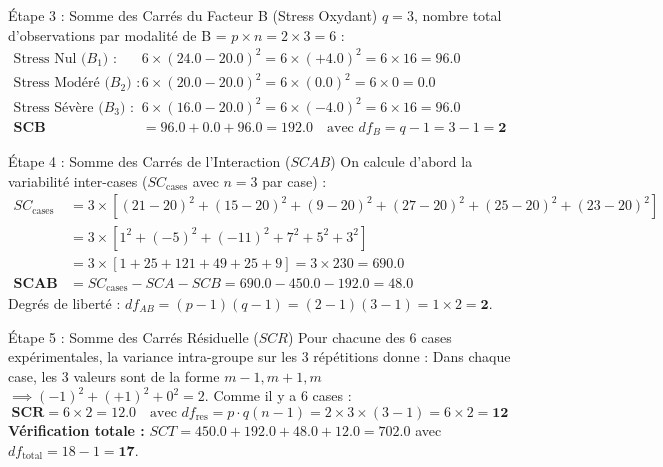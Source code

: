 \documentclass[11pt,a4paper]{article}
\begin{document}
\begin{stepbox}{Étape 3 : Somme des Carrés du Facteur B (Stress Oxydant)}
$q = 3$, nombre total d'observations par modalité de B = $p \times n = 2 \times 3 = 6$ :
\begin{align*}
\text{Stress Nul ($B_1$) :} \quad & 6 \times (24.0 - 20.0)^2 = 6 \times (+4.0)^2 = 6 \times 16 = 96.0 \\
\text{Stress Modéré ($B_2$) :} \quad & 6 \times (20.0 - 20.0)^2 = 6 \times (0.0)^2 = 6 \times 0 = 0.0 \\
\text{Stress Sévère ($B_3$) :} \quad & 6 \times (16.0 - 20.0)^2 = 6 \times (-4.0)^2 = 6 \times 16 = 96.0 \\[2mm]
\mathbf{SCB} &= 96.0 + 0.0 + 96.0 = \mathbf{192.0} \quad \text{avec } df_B = q - 1 = 3 - 1 = \mathbf{2}
\end{align*}
\end{stepbox}

\begin{stepbox}{Étape 4 : Somme des Carrés de l'Interaction ($SCAB$)}
On calcule d'abord la variabilité inter-cases ($SC_{\text{cases}}$ avec $n = 3$ par case) :
\begin{align*}
SC_{\text{cases}} &= 3 \times \left[ (21-20)^2 + (15-20)^2 + (9-20)^2 + (27-20)^2 + (25-20)^2 + (23-20)^2 \right] \\
&= 3 \times \left[ 1^2 + (-5)^2 + (-11)^2 + 7^2 + 5^2 + 3^2 \right] \\
&= 3 \times \left[ 1 + 25 + 121 + 49 + 25 + 9 \right] = 3 \times 230 = \mathbf{690.0} \\[2mm]
\mathbf{SCAB} &= SC_{\text{cases}} - SCA - SCB = 690.0 - 450.0 - 192.0 = \mathbf{48.0}
\end{align*}
Degrés de liberté : $df_{AB} = (p - 1)(q - 1) = (2 - 1)(3 - 1) = 1 \times 2 = \mathbf{2}$.
\end{stepbox}

\begin{stepbox}{Étape 5 : Somme des Carrés Résiduelle ($SCR$)}
Pour chacune des 6 cases expérimentales, la variance intra-groupe sur les 3 répétitions donne :
Dans chaque case, les 3 valeurs sont de la forme $m-1, m+1, m$ $\implies (-1)^2 + (+1)^2 + 0^2 = 2$.
Comme il y a 6 cases :
\begin{equation*}
\mathbf{SCR} = 6 \times 2 = \mathbf{12.0} \quad \text{avec } df_{\text{res}} = p \cdot q(n - 1) = 2 \times 3 \times (3 - 1) = 6 \times 2 = \mathbf{12}
\end{equation*}
\textbf{Vérification totale :} $SCT = 450.0 + 192.0 + 48.0 + 12.0 = \mathbf{702.0}$ avec $df_{\text{total}} = 18 - 1 = \mathbf{17}$.
\end{stepbox}
\end{document}
